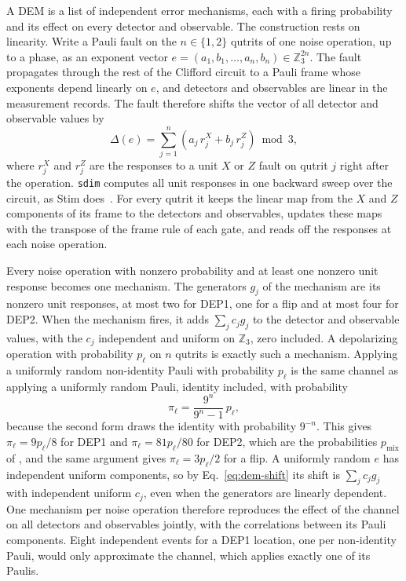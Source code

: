 A DEM is a list of independent error mechanisms, each with a firing probability and its effect on every detector and observable. The construction rests on linearity. Write a Pauli fault on the $n \in \{1,2\}$ qutrits of one noise operation, up to a phase, as an exponent vector $e = (a_1, b_1, \dots, a_n, b_n) \in \mathbb{Z}_3^{2n}$. The fault propagates through the rest of the Clifford circuit to a Pauli frame whose exponents depend linearly on $e$, and detectors and observables are linear in the measurement records. The fault therefore shifts the vector of all detector and observable values by
\begin{equation}
    \Delta(e) = \sum_{j=1}^{n} \left( a_j\, r^X_j + b_j\, r^Z_j \right) \bmod 3,
    \label{eq:dem-shift}
\end{equation}
where $r^X_j$ and $r^Z_j$ are the responses to a unit $X$ or $Z$ fault on qutrit $j$ right after the operation. \texttt{sdim} computes all unit responses in one backward sweep over the circuit, as Stim does~\cite{Gidney2021Stim}. For every qutrit it keeps the linear map from the $X$ and $Z$ components of its frame to the detectors and observables, updates these maps with the transpose of the frame rule of each gate, and reads off the responses at each noise operation.

Every noise operation with nonzero probability and at least one nonzero unit response becomes one mechanism. The generators $g_j$ of the mechanism are its nonzero unit responses, at most two for DEP1, one for a flip and at most four for DEP2. When the mechanism fires, it adds $\sum_j c_j g_j$ to the detector and observable values, with the $c_j$ independent and uniform on $\mathbb{Z}_3$, zero included. A depolarizing operation with probability $p_\ell$ on $n$ qutrits is exactly such a mechanism. Applying a uniformly random non-identity Pauli with probability $p_\ell$ is the same channel as applying a uniformly random Pauli, identity included, with probability
\begin{equation}
    \pi_\ell = \frac{9^n}{9^n - 1}\, p_\ell ,
    \label{eq:dem-firing}
\end{equation}
because the second form draws the identity with probability $9^{-n}$. This gives $\pi_\ell = 9p_\ell/8$ for DEP1 and $\pi_\ell = 81p_\ell/80$ for DEP2, which are the probabilities $p_{\mathrm{mix}}$ of , and the same argument gives $\pi_\ell = 3p_\ell/2$ for a flip. A uniformly random $e$ has independent uniform components, so by Eq.~\eqref{eq:dem-shift} its shift is $\sum_j c_j g_j$ with independent uniform $c_j$, even when the generators are linearly dependent. One mechanism per noise operation therefore reproduces the effect of the channel on all detectors and observables jointly, with the correlations between its Pauli components. Eight independent events for a DEP1 location, one per non-identity Pauli, would only approximate the channel, which applies exactly one of its Paulis.

